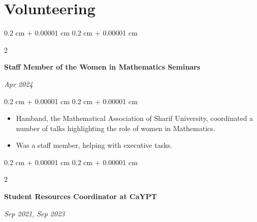 \documentclass[10pt, letterpaper]{article}
\newenvironment{highlights}{
    \begin{itemize}[
        topsep=0.05 cm,
        parsep=0.04 cm,
        partopsep=0pt,
        itemsep=0pt,
        leftmargin=0.4 cm + 10pt
    ]
}{
    \end{itemize}
} %
\newenvironment{onecolentry}{
    \begin{adjustwidth}{
        0.2 cm + 0.00001 cm
    }{
        0.2 cm + 0.00001 cm
    }
}{
    \end{adjustwidth}
} %
\newenvironment{twocolentry}[2][]{
    \onecolentry
    \def\secondColumn{#2}
    \setcolumnwidth{\fill, 4.5 cm}
    \begin{paracol}{2}
}{
    \switchcolumn \raggedleft \secondColumn
    \end{paracol}
    \endonecolentry
} %
\begin{document}
    \section{Volunteering}
        \begin{twocolentry}{
            
            
        \textit{Apr 2024}}
            \textbf{Staff Member of the Women in Mathematics Seminars}
        \end{twocolentry}

        \vspace{0.10 cm}
        \begin{onecolentry}
            \begin{highlights}
                \item Hamband, the Mathematical Association of Sharif University, coordinated a number of talks highlighting the role of women in Mathematics. 
                \item Was a staff member, helping with executive tasks.
            \end{highlights}
        \end{onecolentry}


            
            


        \vspace{0.2 cm}

        \begin{twocolentry}{
            
            
        \textit{Sep 2021, Sep 2023}}
            \textbf{Student Resources Coordinator at CaYPT}
        \end{twocolentry}
\end{document}
